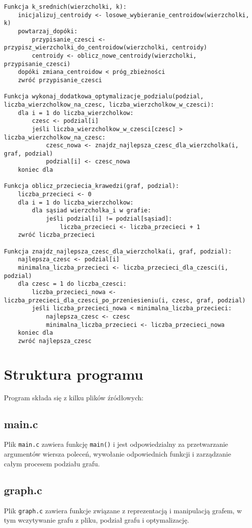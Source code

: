 \documentclass[a4paper,12pt]{article}
\begin{document}
\begin{verbatim}
Funkcja k_srednich(wierzcholki, k):
    inicjalizuj_centroidy <- losowe_wybieranie_centroidow(wierzcholki, k)
    powtarzaj_dopóki:
        przypisanie_czesci <- przypisz_wierzcholki_do_centroidow(wierzcholki, centroidy)
        centroidy <- oblicz_nowe_centroidy(wierzcholki, przypisanie_czesci)
    dopóki zmiana_centroidow < próg_zbieżności
    zwróć przypisanie_czesci

Funkcja wykonaj_dodatkowa_optymalizacje_podzialu(podzial, liczba_wierzcholkow_na_czesc, liczba_wierzcholkow_w_czesci):
    dla i = 1 do liczba_wierzcholkow:
        czesc <- podzial[i]
        jeśli liczba_wierzcholkow_w_czesci[czesc] > liczba_wierzcholkow_na_czesc:
            czesc_nowa <- znajdz_najlepsza_czesc_dla_wierzcholka(i, graf, podzial)
            podzial[i] <- czesc_nowa
    koniec dla

Funkcja oblicz_przeciecia_krawedzi(graf, podzial):
    liczba_przecieci <- 0
    dla i = 1 do liczba_wierzcholkow:
        dla sąsiad wierzcholka_i w grafie:
            jeśli podzial[i] != podzial[sąsiad]:
                liczba_przecieci <- liczba_przecieci + 1
    zwróć liczba_przecieci

Funkcja znajdz_najlepsza_czesc_dla_wierzcholka(i, graf, podzial):
    najlepsza_czesc <- podzial[i]
    minimalna_liczba_przecieci <- liczba_przecieci_dla_czesci(i, podzial)
    dla czesc = 1 do liczba_czesci:
        liczba_przecieci_nowa <- liczba_przecieci_dla_czesci_po_przeniesieniu(i, czesc, graf, podzial)
        jeśli liczba_przecieci_nowa < minimalna_liczba_przecieci:
            najlepsza_czesc <- czesc
            minimalna_liczba_przecieci <- liczba_przecieci_nowa
    koniec dla
    zwróć najlepsza_czesc
\end{verbatim}

\section{Struktura programu}

Program składa się z kilku plików źródłowych:

\subsection{main.c}
Plik \texttt{main.c} zawiera funkcję \texttt{main()} i jest odpowiedzialny za przetwarzanie argumentów wiersza poleceń, wywołanie odpowiednich funkcji i zarządzanie całym procesem podziału grafu.

\subsection{graph.c}
Plik \texttt{graph.c} zawiera funkcje związane z reprezentacją i manipulacją grafem, w tym wczytywanie grafu z pliku, podział grafu i optymalizację.
\end{document}
